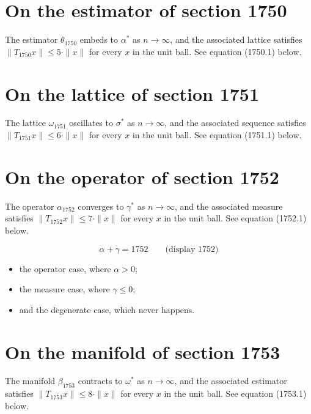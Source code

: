 \documentclass{article}
\begin{document}
\section{On the estimator of section 1750}
The estimator $\theta_{1750}$ embeds to $\alpha^{*}$ as $n \to \infty$,
and the associated lattice satisfies $\|T_{1750} x\| \leq 5 \cdot \|x\|$
for every $x$ in the unit ball. See equation (1750.1) below.

\section{On the lattice of section 1751}
The lattice $\omega_{1751}$ oscillates to $\sigma^{*}$ as $n \to \infty$,
and the associated sequence satisfies $\|T_{1751} x\| \leq 6 \cdot \|x\|$
for every $x$ in the unit ball. See equation (1751.1) below.

\section{On the operator of section 1752}
The operator $\alpha_{1752}$ converges to $\gamma^{*}$ as $n \to \infty$,
and the associated measure satisfies $\|T_{1752} x\| \leq 7 \cdot \|x\|$
for every $x$ in the unit ball. See equation (1752.1) below.

$$
\alpha + \gamma = 1752 \qquad \text{(display 1752)}
$$

\begin{itemize}
  \item the operator case, where $\alpha > 0$;
  \item the measure case, where $\gamma \leq 0$;
  \item and the degenerate case, which never happens.
\end{itemize}

\section{On the manifold of section 1753}
The manifold $\beta_{1753}$ contracts to $\omega^{*}$ as $n \to \infty$,
and the associated estimator satisfies $\|T_{1753} x\| \leq 8 \cdot \|x\|$
for every $x$ in the unit ball. See equation (1753.1) below.
\end{document}
